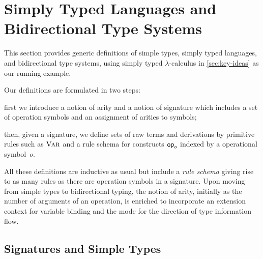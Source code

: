 
\section{Simply Typed Languages and Bidirectional Type Systems}\label{sec:defs}
This section provides generic definitions
of simple types, simply typed languages, and bidirectional type systems, using simply typed $\lambda$-calculus in \cref{sec:key-ideas} as our running example.

Our definitions are formulated in two steps:
\begin{enumerate*}
  \item first we introduce a notion of arity and a notion of signature which includes a set of operation symbols and an assignment of arities to symbols;
\item then, given a signature, we define sets of raw terms and derivations by primitive rules such as $\textnormal{\textsc{Var}}$ and a rule schema for constructs $\mathsf{op}_o$ indexed by a operational symbol~$o$.
\end{enumerate*}
All these definitions are inductive as usual but include a \emph{rule schema} giving rise to as many rules as there are operation symbols in a signature.
Upon moving from simple types to bidirectional typing, the notion of arity, initially as the number of arguments of an operation, is enriched to incorporate an extension context for variable binding and the mode for the direction of type information flow.

\subsection{Signatures and Simple Types} \label{subsec:simple-types}

